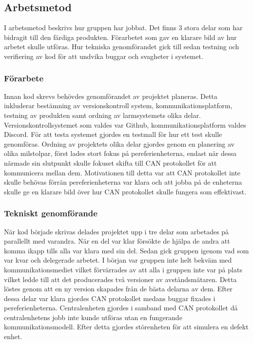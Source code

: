 \documentclass{article}
\begin{document}

\subsection{Arbetsmetod}
I arbetsmetod beskrivs hur gruppen har jobbat. Det finns 3 stora delar som har bidragit till den färdiga produkten. Förarbetet som gav en klarare bild av hur arbetet skulle utföras. Hur tekniska genomförandet gick till sedan testning och verifiering av kod för att undvika buggar och svagheter i systemet.

\subsubsection{Förarbete}
Innan kod skrevs behövdes genomförandet av projektet planeras. 
Detta inkluderar bestämning av versionskontroll system, kommunikationsplatform, testning av produkten samt ordning av larmsystemets olika delar. 
Versionskontrollsystemet som valdes var Github, kommunikationsplatform valdes Discord. 
För att testa systemet gjordes en testmall för hur ett test skulle genomföras. 
Ordning av projektets olika delar gjordes genom en planering av olika milstolpar, först lades stort fokus på pereferienheterna, endast när dessa närmade sin slutpunkt skulle fokuset skifta till CAN protokollet för att kommunicera mellan dem. 
Motivationen till detta var att CAN protokollet inte skulle behövas förrän pereferienheterna var klara och att jobba på de enheterna skulle ge en klarare bild över hur CAN protokollet skulle fungera som effektivast.

\subsubsection{Tekniskt genomförande}
När kod började skrivas delades projektet upp i tre delar som arbetades på parallellt med varandra.
När en del var klar försökte de hjälpa de andra att komma ikapp tills alla var klara med sin del.
Sedan gick gruppen igenom vad som var kvar och delegerade arbetet. 
I början var gruppen inte helt bekväm med kommunikationsmediet vilket förvärrades av att alla i gruppen inte var på plats vilket ledde till att det producerades två versioner av avståndsmätaren.
Detta löstes genom att en ny version skapades från de bästa delarna av dem.
Efter dessa delar var klara gjordes CAN protokollet medans buggar fixades i pereferienheterna. Centralenheten gjordes i samband med CAN protokollet då centralenhetens jobb inte kunde utföras utan en fungerande kommunikationsmodell.
Efter detta gjordes störenheten för att simulera en defekt enhet.
\end{document}
